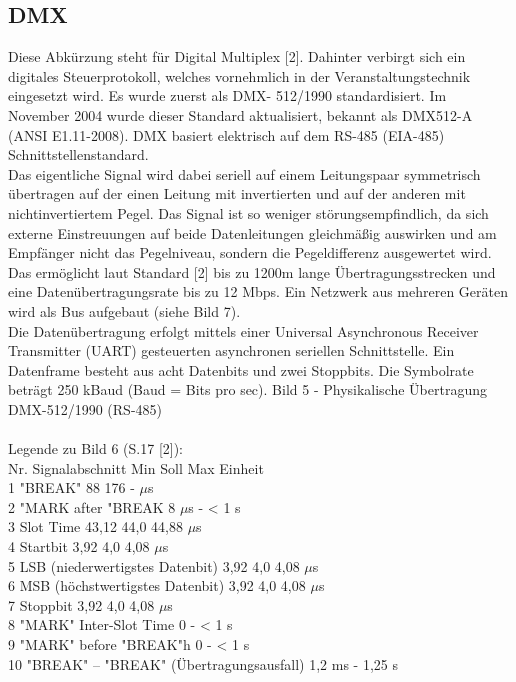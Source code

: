 \documentclass[11pt]{scrartcl}
\begin{document}
\subsection{DMX}
Diese Abkürzung steht für Digital Multiplex [2]. Dahinter verbirgt sich ein digitales Steuerprotokoll,
welches vornehmlich in der Veranstaltungstechnik eingesetzt wird. Es wurde zuerst als DMX-
512/1990 standardisiert. Im November 2004 wurde dieser Standard aktualisiert, bekannt als
DMX512-A (ANSI E1.11-2008). DMX basiert elektrisch auf dem RS-485 (EIA-485)
Schnittstellenstandard.\\
Das eigentliche Signal wird dabei seriell auf einem Leitungspaar symmetrisch übertragen auf der
einen Leitung mit invertierten und auf der anderen mit nichtinvertiertem Pegel. Das Signal ist so
weniger störungsempfindlich, da sich externe Einstreuungen auf beide Datenleitungen gleichmäßig
auswirken und am Empfänger nicht das Pegelniveau, sondern die Pegeldifferenz ausgewertet wird.
Das ermöglicht laut Standard [2] bis zu 1200m lange Übertragungsstrecken und eine
Datenübertragungsrate bis zu 12 Mbps. Ein Netzwerk aus mehreren Geräten wird als Bus aufgebaut
(siehe Bild 7).\\
Die Datenübertragung erfolgt mittels einer Universal Asynchronous Receiver Transmitter (UART)
gesteuerten asynchronen seriellen Schnittstelle. Ein Datenframe besteht aus acht Datenbits und zwei
Stoppbits. Die Symbolrate beträgt 250 kBaud (Baud = Bits pro sec).
Bild 5 - Physikalische Übertragung DMX-512/1990 (RS-485)\\
\\
Legende zu Bild 6 (S.17 [2]):\\
Nr. Signalabschnitt Min Soll Max Einheit\\
1 "BREAK" 88 176 - $\mu$s\\
2 "MARK after "BREAK 8 $\mu$s - < 1 s\\
3 Slot Time 43,12 44,0 44,88 $\mu$s\\
4 Startbit 3,92 4,0 4,08 $\mu$s\\
5 LSB (niederwertigstes Datenbit) 3,92 4,0 4,08 $\mu$s\\
6 MSB (höchstwertigstes Datenbit) 3,92 4,0 4,08 $\mu$s\\
7 Stoppbit 3,92 4,0 4,08 $\mu$s\\
8 "MARK" Inter-Slot Time 0 - < 1 s\\
9 "MARK" before "BREAK"h 0 - < 1 s\\
10 "BREAK" – "BREAK" (Übertragungsausfall) 1,2 ms - 1,25 s\\
\end{document}
